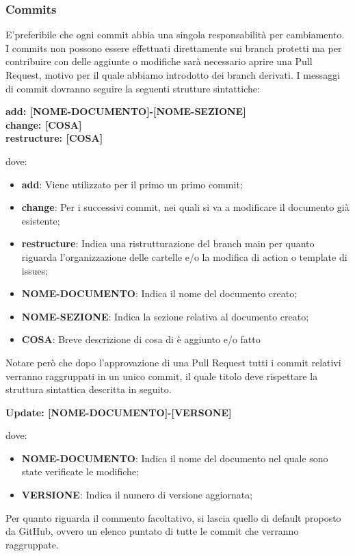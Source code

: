         \subsubsection{Commits}\label{inf:comm}
        E'preferibile che ogni commit abbia una singola responsabilità per cambiamento.
        I commits non possono essere effettuati direttamente sui branch protetti ma per contribuire con delle aggiunte o
        modifiche sarà necessario aprire una Pull Request, motivo per il quale abbiamo introdotto dei branch derivati.
        I messaggi di commit dovranno seguire la seguenti strutture sintattiche:
        \begin{center}
            \textbf{add: [NOME-DOCUMENTO]-[NOME-SEZIONE]\\
            change: [COSA]\\
            restructure: [COSA]}
        \end{center}
        dove: 
        \begin{itemize}
            \item \textbf{add}: Viene utilizzato per il primo un primo commit;
            \item \textbf{change}: Per i successivi commit, nei quali si va a modificare il documento già esistente;
            \item \textbf{restructure}: Indica una ristrutturazione del branch main per quanto riguarda l'organizzazione delle cartelle e/o la modifica di action o template di issues;
            \item \textbf{NOME-DOCUMENTO}: Indica il nome del documento creato;
            \item \textbf{NOME-SEZIONE}: Indica la sezione relativa al documento creato;
            \item \textbf{COSA}: Breve descrizione di cosa di è aggiunto e/o fatto
        \end{itemize}

        Notare però che dopo l'approvazione di una Pull Request tutti i commit
        relativi verranno raggruppati in un unico commit, il quale titolo deve rispettare la struttura sintattica descritta in
        seguito.
        \begin{center}
            \textbf{Update: [NOME-DOCUMENTO]-[VERSONE]}
        \end{center}
        dove:

        \begin{itemize}
            \item \textbf{NOME-DOCUMENTO}: Indica il nome del documento nel quale sono state verificate le modifiche;
            \item \textbf{VERSIONE}: Indica il numero di versione aggiornata;
        \end{itemize}
        Per quanto riguarda il commento facoltativo, si lascia quello di default proposto da GitHub, ovvero un elenco puntato di tutte le commit che verranno raggruppate.\\
        

